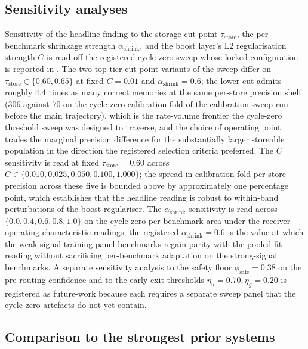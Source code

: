 \subsection{Sensitivity analyses}
\label{sec:disc-sensitivity}

Sensitivity of the headline finding to the storage cut-point $\tau_{\text{store}}$, the per-benchmark shrinkage strength $\alpha_{\text{shrink}}$, and the boost layer's L2 regularisation strength $C$ is read off the registered cycle-zero sweep whose locked configuration is reported in . The two top-tier cut-point variants of the sweep differ on $\tau_{\text{store}} \in \{0.60, 0.65\}$ at fixed $C=0.01$ and $\alpha_{\text{shrink}}=0.6$; the lower cut admits roughly $4.4$ times as many correct memories at the same per-store precision shelf ($306$ against $70$ on the cycle-zero calibration fold of the calibration sweep run before the main trajectory), which is the rate-volume frontier the cycle-zero threshold sweep was designed to traverse, and the choice of operating point trades the marginal precision difference for the substantially larger storeable population in the direction the registered selection criteria preferred. The $C$ sensitivity is read at fixed $\tau_{\text{store}}=0.60$ across $C \in \{0.010, 0.025, 0.050, 0.100, 1.000\}$; the spread in calibration-fold per-store precision across these five is bounded above by approximately one percentage point, which establishes that the headline reading is robust to within-band perturbations of the boost regulariser. The $\alpha_{\text{shrink}}$ sensitivity is read across $\{0.0, 0.4, 0.6, 0.8, 1.0\}$ on the cycle-zero per-benchmark area-under-the-receiver-operating-characteristic readings; the registered $\alpha_{\text{shrink}}=0.6$ is the value at which the weak-signal training-panel benchmarks regain parity with the pooled-fit reading without sacrificing per-benchmark adaptation on the strong-signal benchmarks. A separate sensitivity analysis to the safety floor $\phi_{\text{safe}}=0.38$ on the pre-routing confidence and to the early-exit thresholds $\eta_{u}=0.70, \eta_{g}=0.20$ is registered as future-work because each requires a separate sweep panel that the cycle-zero artefacts do not yet contain.

\subsection{Comparison to the strongest prior systems}
\label{sec:disc-prior}

